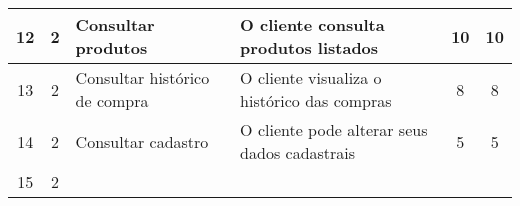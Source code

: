 \documentclass[12pt, a4paper, oneside]{book}
\begin{document}
\begin{table}[]
{\begin{tabular}{@{}|c|c|l|l|c|c|@{}}
		12          &  2            & Consultar produtos          &  O cliente consulta produtos listados              &   10        &     10                          \\ \hline
		13          &  2            &Consultar histórico de compra&  O cliente visualiza o histórico das compras       &   8         &     8                           \\ \hline
		14          &  2            & Consultar cadastro          &  O cliente pode alterar seus dados cadastrais      &   5         &     5                           \\ \hline
		15          &  2            &           &           &                &                 \\ \hline
	\end{tabular}
} %
\end{table}
\end{document}

